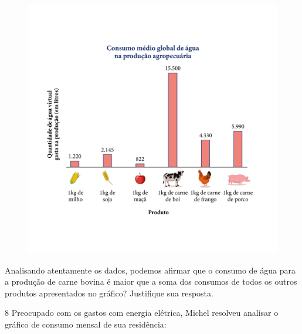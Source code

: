 \begin{figure}[htpb!]
\includegraphics[width=\textwidth]{../ilustracoes/MAT5/SAEB_5ANO_MAT_figura106.png}
\end{figure}

Analisando atentamente os dados, podemos afirmar que o consumo de água
para a produção de carne bovina é maior que a soma dos consumos de todos
os outros produtos apresentados no gráfico? Justifique sua resposta.



\num{8} Preocupado com os gastos com energia elétrica, Michel resolveu
analisar o gráfico de consumo mensal de sua residência:

